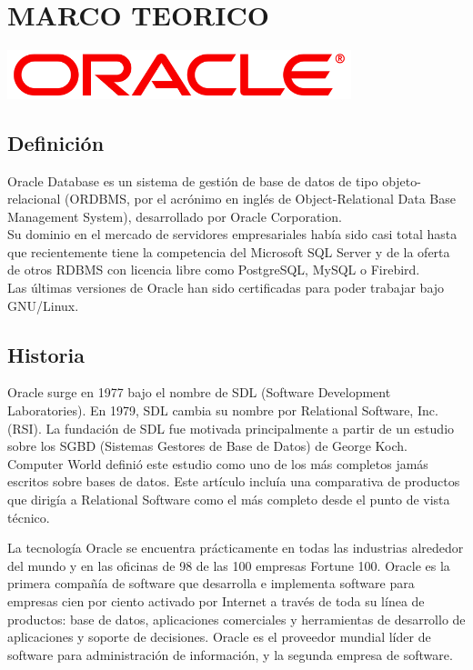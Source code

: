 \section{MARCO TEORICO}
\begin{enumerate}
\vspace{12pt}
\begin{center}
\includegraphics[width=10cm]{Imagenes/Oracle_logo.png}\\
\end{center}

\subsection{Definición}
Oracle Database es un sistema de gestión de base de datos de tipo objeto-relacional (ORDBMS, por el acrónimo en inglés de Object-Relational Data Base Management System), desarrollado por Oracle Corporation.\\
Su dominio en el mercado de servidores empresariales había sido casi total hasta que recientemente tiene la competencia del Microsoft SQL Server y de la oferta de otros RDBMS con licencia libre como PostgreSQL, MySQL o Firebird.\\
Las últimas versiones de Oracle han sido certificadas para poder trabajar bajo GNU/Linux.\\


\subsection{Historia}
Oracle surge en 1977 bajo el nombre de SDL (Software Development Laboratories).
En 1979, SDL cambia su nombre por Relational Software, Inc. (RSI).
La fundación de SDL fue motivada principalmente a partir de un estudio sobre los SGBD (Sistemas Gestores de Base de Datos) de George Koch. Computer World definió este estudio como uno de los más completos jamás escritos sobre bases de datos. Este artículo incluía una comparativa de productos que dirigía a Relational Software como el más completo desde el punto de vista técnico. 

La tecnología Oracle se encuentra prácticamente en todas las industrias alrededor del mundo y en las oficinas de 98 de las 100 empresas Fortune 100. Oracle es la primera compañía de software que desarrolla e implementa software para empresas cien por ciento activado por Internet a través de toda su línea de productos: base de datos, aplicaciones comerciales y herramientas de desarrollo de aplicaciones y soporte de decisiones. Oracle es el proveedor mundial líder de software para administración de información, y la segunda empresa de software.\\


\end{enumerate}
